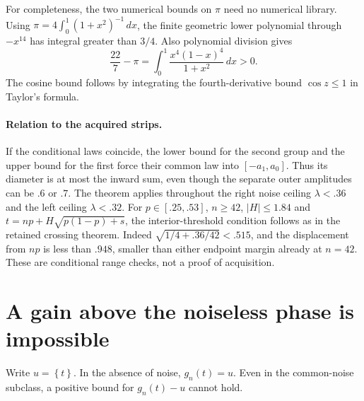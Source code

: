 \documentclass[11pt,a4paper]{article}
\newcommand{\fracpart}[1]{\left\{#1\right\}}
\begin{document}
For completeness, the two numerical bounds on $\pi$ need no numerical
library. Using $\pi=4\int_0^1(1+x^2)^{-1}\,dx$, the finite geometric
lower polynomial through $-x^{14}$ has integral greater than $3/4$.
Also polynomial division gives
\[
 \frac{22}{7}-\pi
       =\int_0^1\frac{x^4(1-x)^4}{1+x^2}\,dx>0.
\]
The cosine bound follows by integrating the fourth-derivative bound
$\cos z\le1$ in Taylor's formula.

\paragraph{Relation to the acquired strips.}
If the conditional laws coincide, the lower bound for the second group and
the upper bound for the first force their common law into $[-a_1,a_0]$.
Thus its diameter is at most the inward sum, even though the separate
outer amplitudes can be $.6$ or $.7$. The theorem applies throughout
the right noise ceiling $\lambda<.36$ and the left ceiling $\lambda<.32$.
For $p\in[.25,.53]$, $n\ge42$, $|H|\le1.84$ and
$t=np+H\sqrt{p(1-p)+s}$, the interior-threshold condition follows as in
the retained crossing theorem. Indeed
$\sqrt{1/4+.36/42}<.515$, and the displacement from $np$ is less than
$.948$, smaller than either endpoint margin already at $n=42$.
These are conditional range checks, not a proof of acquisition.

\section{A gain above the noiseless phase is impossible}
Write $u=\fracpart t$. In the absence of noise, $g_n(t)=u$.
Even in the common-noise subclass, a positive bound for $g_n(t)-u$
cannot hold.
\end{document}
